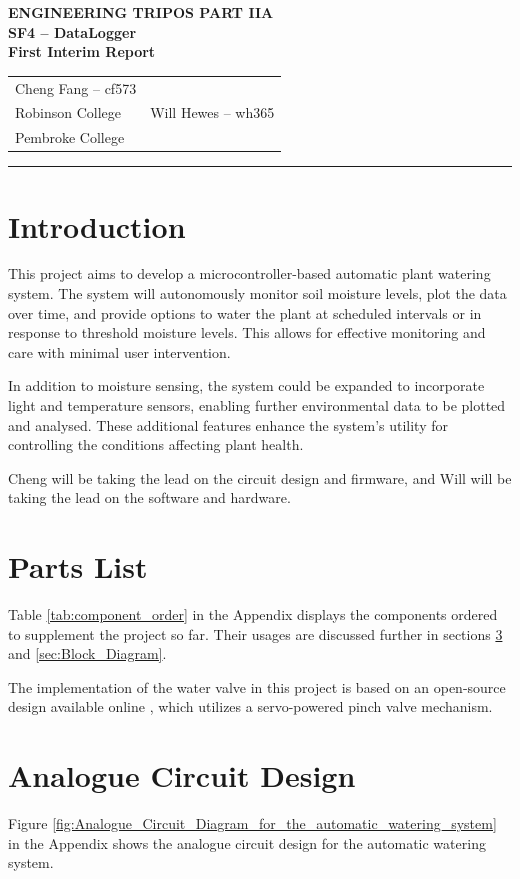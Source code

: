 \documentclass[a4paper,11pt]{article}
\renewcommand{\maketitle}{
    \begin{center}
        \LARGE \textbf{ENGINEERING TRIPOS PART IIA} \\[0.5em]
        \Large \textbf{SF4 – DataLogger} \\[0.5em]
        \textbf{First Interim Report} \\[1.5em]
        \begin{tabularx}{0.7\textwidth}{X X}
            \centering \large Cheng Fang -- cf573 \\ \large Robinson College &
            \centering \large Will Hewes -- wh365 \\ \large Pembroke College
        \end{tabularx}
        \vspace{1em}
    \end{center}
}
\begin{document}
\maketitle
\hrule
\tableofcontents
\newpage

\section{Introduction}
\label{sec:Introduction}

This project aims to develop a microcontroller-based 
automatic plant watering system.
The system will autonomously monitor soil moisture levels, 
plot the data over time, and provide options to water the plant
at scheduled intervals or in response to threshold moisture levels.
This allows for effective monitoring and care with minimal user intervention.

In addition to moisture sensing, the system could be expanded to 
incorporate light and temperature sensors,
enabling further environmental data to be plotted and analysed.
These additional features enhance the system's utility
for controlling the conditions affecting plant health.

Cheng will be taking the lead on the circuit design and firmware,
and Will will be taking the lead on the software and hardware.

\section{Parts List}
\label{sec:Parts_List}

Table \ref{tab:component_order} in the Appendix displays the components 
ordered to supplement the project so far. Their usages are discussed further in sections 
\ref{sec:Analogue_Circuit_Design} and \ref{sec:Block_Diagram}. 

The implementation of the water valve in this project is based on an open-source design available online \cite{pinch_valve_design}, which utilizes a servo-powered pinch valve mechanism.

\section{Analogue Circuit Design}
\label{sec:Analogue_Circuit_Design}

Figure \ref{fig:Analogue_Circuit_Diagram_for_the_automatic_watering_system} 
in the Appendix shows the analogue circuit design for the automatic watering system.
\end{document}
